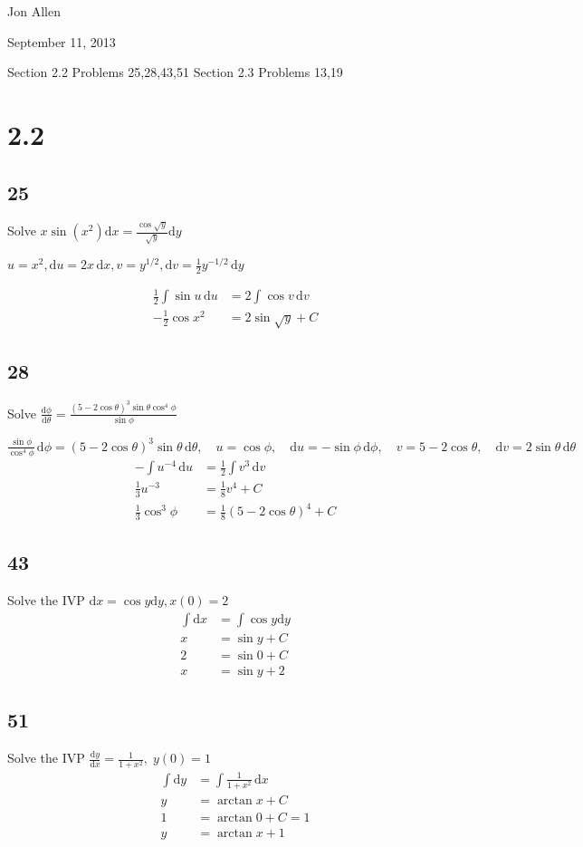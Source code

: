 \documentclass{article}
\begin{document}
Jon Allen

September 11, 2013

Section 2.2 Problems 25,28,43,51 Section 2.3 Problems 13,19
\section*{2.2}
\subsection*{25}
Solve \(x \sin \left( x^2 \right) \mathrm{d}x=\frac{\cos \sqrt{y}}{\sqrt{y}}\mathrm{d}y\)

\(u=x^2, \mathrm{d}u=2x\,\mathrm{d}x, v=y^{1/2}, \mathrm{d}v=\frac{1}{2}y^{-1/2}\,\mathrm{d}y\)

\begin{align*}
\frac{1}{2}\int{\sin u\,\mathrm{d}u}&=2\int{\cos v\,\mathrm{d}v}\\
-\frac{1}{2}\cos{x^2}&=2\sin{\sqrt{y}}+C
\end{align*}
\subsection*{28}
Solve \(\frac{\mathrm{d}\phi}{\mathrm{d}\theta}=\frac{\left(5-2\cos\theta\right)^3 \sin\theta\cos^4\phi}{\sin\phi}\)

\( \frac{\sin\phi}{\cos^4\phi}\,\mathrm{d}\phi=\left(5-2\cos\theta\right)^3\sin\theta\,\mathrm{d}\theta,\quad u=\cos\phi,\quad \mathrm{d}u=-\sin\phi\,\mathrm{d}\phi,\quad v=5-2\cos\theta,\quad \mathrm{d}v=2\sin\theta\,\mathrm{d}\theta \)
\begin{align*}
-\int{u^{-4}\,\mathrm{d}u}&=\frac{1}{2}\int{v^3\,\mathrm{d}v}\\
\frac{1}{3}u^{-3}&=\frac{1}{8}v^4+C\\
\frac{1}{3}\cos^3\phi&=\frac{1}{8}\left(5-2\cos\theta\right)^4+C
\end{align*}
\subsection*{43}
Solve the IVP
\(\mathrm{d}x=\cos{y}\mathrm{d}y, x(0)=2\)
\begin{align*}
\int{\mathrm{d}x}&=\int{\cos{y}\mathrm{d}y}\\
x&=\sin{y} + C\\
2&=\sin{0}+C\\
x&=\sin{y}+2
\end{align*}
\subsection*{51}
Solve the IVP
\(\frac{\mathrm{d}y}{\mathrm{d}x}=\frac{1}{1+x^2},\; y(0)=1\)
\begin{align*}
\int{\mathrm{d}y}&=\int{\frac{1}{1+x^2}\,\mathrm{d}x}\\
y&=\arctan{x}+C\\
1&=\arctan{0}+C=1\\
y&=\arctan{x}+1
\end{align*}
\end{document}
